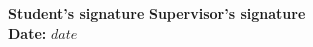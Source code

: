 \vfill

\noindent
\textbf{Student's signature} \hfill \textbf{Supervisor's signature} \hspace{10em} \mbox{}\\

\noindent
\textbf{Date:} $date$